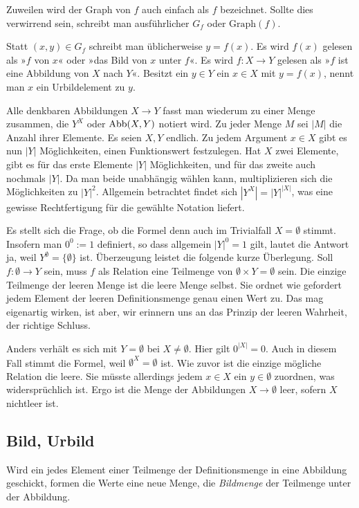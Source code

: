 Zuweilen wird der Graph von $f$ auch einfach als $f$ bezeichnet.
Sollte dies verwirrend sein, schreibt man ausführlicher $G_f$ oder
$\mathrm{Graph}(f)$.

Statt $(x,y)\in G_f$ schreibt man üblicherweise $y=f(x)$. Es
wird $f(x)$ gelesen als »$f$ von $x$« oder »das Bild von $x$ unter
$f$«. Es wird $f\colon X\to Y$ gelesen als »$f$ ist eine Abbildung
von $X$ nach $Y$«. Besitzt ein $y\in Y$ ein $x\in X$ mit $y=f(x)$,
nennt man $x$ ein Urbildelement zu $y$.

Alle denkbaren Abbildungen $X\to Y$ fasst man wiederum zu einer
Menge zusammen, die $Y^X$ oder $\operatorname{Abb}(X,Y)$ notiert wird. Zu jeder
Menge $M$ sei $|M|$ die Anzahl ihrer Elemente. Es seien $X,Y$ endlich.
Zu jedem Argument $x\in X$ gibt es nun $|Y|$ Möglichkeiten, einen
Funktionswert festzulegen. Hat $X$ zwei Elemente, gibt es für das
erste Elemente $|Y|$ Möglichkeiten, und für das zweite auch nochmals
$|Y|$. Da man beide unabhängig wählen kann, multiplizieren sich die
Möglichkeiten zu $|Y|^2$. Allgemein betrachtet findet sich
$|Y^X| = |Y|^{|X|}$, was eine gewisse Rechtfertigung für die gewählte
Notation liefert.

Es stellt sich die Frage, ob die Formel denn auch im Trivialfall
$X=\emptyset$ stimmt. Insofern man $0^0:=1$ definiert, so dass allgemein
$|Y|^0=1$ gilt, lautet die Antwort ja, weil
$Y^\emptyset=\{\emptyset\}$ ist. Überzeugung leistet die folgende
kurze Überlegung. Soll $f\colon\emptyset\to Y$
sein, muss $f$ als Relation eine Teilmenge von $\emptyset\times Y=\emptyset$
sein. Die einzige Teilmenge der leeren Menge ist die leere Menge selbst.
Sie ordnet wie gefordert jedem Element der leeren Definitionsmenge genau
einen Wert zu. Das mag eigenartig wirken, ist aber, wir erinnern uns an
das Prinzip der leeren Wahrheit, der richtige Schluss.

Anders verhält es sich mit $Y=\emptyset$ bei $X\ne\emptyset$.
Hier gilt $0^{|X|}=0$. Auch in diesem Fall stimmt die Formel, weil
$\emptyset^X = \emptyset$ ist. Wie zuvor ist die einzige mögliche Relation
die leere. Sie müsste allerdings jedem $x\in X$ ein $y\in\emptyset$
zuordnen, was widersprüchlich ist. Ergo ist die Menge der Abbildungen
$X\to\emptyset$ leer, sofern $X$ nichtleer ist.

\subsection{Bild, Urbild}

Wird ein jedes Element einer Teilmenge der Definitionsmenge in eine
Abbildung geschickt, formen die Werte eine neue Menge, die
\emph{Bildmenge} der Teilmenge unter der Abbildung.

